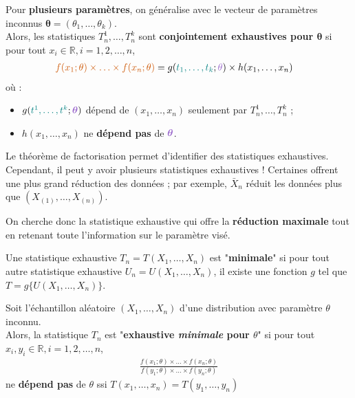 \documentclass[10pt, french]{article}
\begin{document}
\begin{multicols*}{2}
\begin{definitionNOHFILLprop}
\tcbline

Pour \textbf{plusieurs paramètres}, on généralise avec le vecteur de paramètres inconnus $\bm{\theta}	=	(\theta_{1}, \dots, \theta_{k})$.\\
Alors, les statistiques $T^{1}_{n}, \dots, T^{k}_{n}$ sont \textbf{conjointement exhaustives pour $\bm{\theta}$} si pour tout $x_{i}	\in \mathbb{R}, i = 1, 2, \dots, n$, 
\begin{align*}
	{\color{burntorange}f(x_{1}; \theta) \times \hdots \times f(x_{n}; \theta)}
	&=	g({\color{teal}t_{1}, \dots, t_{k}}; {\color{amethyst}\theta}) \times h(x_{1}, \dots, x_{n})
\end{align*}
où :
\begin{itemize}
	\item	$g({\color{teal}t^{1}, \dots, t^{k}}; {\color{amethyst}\bm{\theta}})$ dépend de $(x_{1}, \dots, x_{n})$ seulement par $T^{1}_{n}, \dots, T^{k}_{n}$ ;
	\item	$h(x_{1}, \dots, x_{n})$ ne \textbf{dépend pas} de ${\color{amethyst}\bm{\theta}}$.
\end{itemize}	
\end{definitionNOHFILLprop}

Le théorème de factorisation permet d'identifier des statistiques exhaustives. Cependant, il peut y avoir plusieurs statistiques exhaustives ! Certaines offrent une plus grand réduction des données ; par exemple, $\bar{X}_{n}$ réduit les données plus que $(X_{(1)}, \dots, X_{(n)})$. 

On cherche donc la statistique exhaustive qui offre la \textbf{réduction maximale} tout en retenant toute l'information sur le paramètre visé.

\begin{definitionNOHFILL}
Une statistique exhaustive $T_{n}	=	T(X_{1}, \dots, X_{n})$ est "\textbf{minimale}" si pour tout autre statistique exhaustive $U_{n}	=	U(X_{1}, \dots, X_{n})$, il existe une fonction $g$ tel que $T	=	g\{U(X_{1}, \dots, X_{n})\}$.

\begin{definitionNOHFILLprop}
Soit l'échantillon aléatoire $(X_{1}, \dots, X_{n})$ d'une distribution avec paramètre $\theta$ inconnu.\\
Alors, la statistique $T_{n}$ est "\textbf{exhaustive \textit{minimale} pour $\theta$}" si pour tout $x_{i}, y_{i}	\in \mathbb{R}, i = 1, 2, \dots, n$,
\begin{align*}
	\frac{f(x_{1}; \theta) \times \hdots \times f(x_{n}; \theta)}{f(y_{1}; \theta) \times \hdots \times f(y_{n}; \theta)}
\end{align*}
ne \textbf{dépend pas} de $\theta$ ssi $T(x_{1}, \dots, x_{n})	=	T(y_{1}, \dots, y_{n})$
\end{definitionNOHFILLprop}


\end{definitionNOHFILL}
\end{multicols*}
\end{document}
